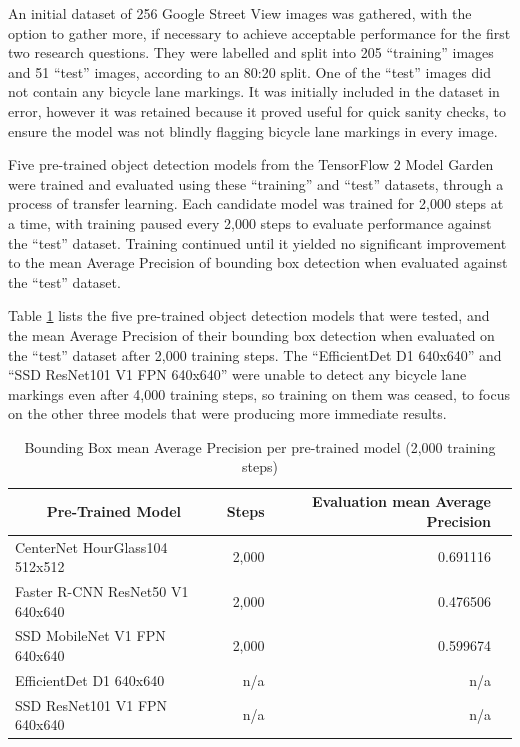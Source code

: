 \documentclass[11pt,twoside]{report}
\begin{document}
An initial dataset of 256 Google Street View images was gathered, with the option to gather more, if necessary to achieve acceptable performance for the first two research questions.  They were labelled and split into 205 ``training''  images and 51 ``test'' images, according to an 80:20 split.  One of the ``test'' images did not contain any bicycle lane markings.  It was initially included in the dataset in error, however it was retained because it proved useful for quick sanity checks, to ensure the model was not blindly flagging bicycle lane markings in every image.

Five pre-trained object detection models from the TensorFlow 2 Model Garden were trained and evaluated using these ``training'' and ``test'' datasets, through a process of transfer learning.  Each candidate model was trained for 2,000 steps at a time, with training paused every 2,000 steps to evaluate performance against the ``test'' dataset.  Training continued until it yielded no significant improvement to the mean Average Precision of bounding box detection when evaluated against the ``test'' dataset.  

Table \ref{table1} lists the five pre-trained object detection models that were tested, and the mean Average Precision of their bounding box detection when evaluated on the ``test'' dataset after 2,000 training steps.  The ``EfficientDet D1 640x640'' and ``SSD ResNet101 V1 FPN 640x640'' were unable to detect any bicycle lane markings even after 4,000 training steps, so training on them was ceased, to focus on the other three models that were producing more immediate results.

\begin{table}[h]
\centering
\begin{tabular}{|l|r|r|r|}
\hline
\multicolumn{1}{|c|}{\bfseries Pre-Trained Model} & \textbf{Steps} & \textbf{Evaluation mean Average Precision} \\
\hline
CenterNet HourGlass104 512x512 & 2,000 & 0.691116 \\
Faster R-CNN ResNet50 V1 640x640 & 2,000 & 0.476506 \\
SSD MobileNet V1 FPN 640x640 & 2,000 & 0.599674 \\
EfficientDet D1 640x640 & n/a & n/a \\
SSD ResNet101 V1 FPN 640x640 & n/a & n/a \\
\hline
\end{tabular}
\caption{Bounding Box mean Average Precision per pre-trained model (2,000 training steps)}
\label{table1}
\end{table}
\end{document}
